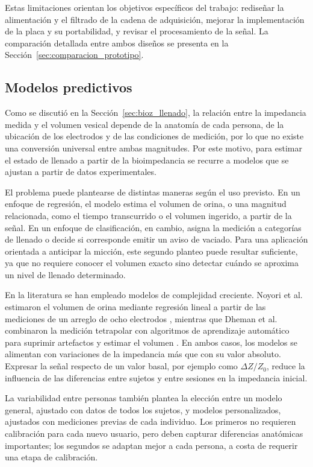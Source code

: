 \documentclass[12pt,a4paper]{article}
\begin{document}
Estas limitaciones orientan los objetivos específicos del trabajo: rediseñar la alimentación y el
filtrado de la cadena de adquisición, mejorar la implementación de la placa y su portabilidad, y
revisar el procesamiento de la señal. La comparación detallada entre ambos diseños se presenta en la
Sección~\ref{sec:comparacion_prototipo}.

\subsection{Modelos predictivos}

Como se discutió en la Sección~\ref{sec:bioz_llenado}, la relación entre la impedancia medida y el
volumen vesical depende de la anatomía de cada persona, de la ubicación de los electrodos y de las
condiciones de medición, por lo que no existe una conversión universal entre ambas magnitudes. Por
este motivo, para estimar el estado de llenado a partir de la bioimpedancia se recurre a modelos que
se ajustan a partir de datos experimentales.

El problema puede plantearse de distintas maneras según el uso previsto. En un enfoque de regresión,
el modelo estima el volumen de orina, o una magnitud relacionada, como el tiempo transcurrido o el
volumen ingerido, a partir de la señal. En un enfoque de clasificación, en cambio, asigna la medición
a categorías de llenado o decide si corresponde emitir un aviso de vaciado. Para una aplicación
orientada a anticipar la micción, este segundo planteo puede resultar suficiente, ya que no requiere
conocer el volumen exacto sino detectar cuándo se aproxima un nivel de llenado determinado.

En la literatura se han empleado modelos de complejidad creciente. Noyori et al. estimaron el volumen
de orina mediante regresión lineal a partir de las mediciones de un arreglo de ocho electrodos
\cite{noyori2021device}, mientras que Dheman et al. combinaron la medición tetrapolar con algoritmos de
aprendizaje automático para suprimir artefactos y estimar el volumen \cite{dheman2023bladder}. En
ambos casos, los modelos se alimentan con variaciones de la impedancia más que con su valor absoluto.
Expresar la señal respecto de un valor basal, por ejemplo como $\Delta Z/Z_0$, reduce la influencia de
las diferencias entre sujetos y entre sesiones en la impedancia inicial.

La variabilidad entre personas también plantea la elección entre un modelo general, ajustado con
datos de todos los sujetos, y modelos personalizados, ajustados con mediciones previas de cada
individuo. Los primeros no requieren calibración para cada nuevo usuario, pero deben capturar
diferencias anatómicas importantes; los segundos se adaptan mejor a cada persona, a costa de requerir
una etapa de calibración.
\end{document}

